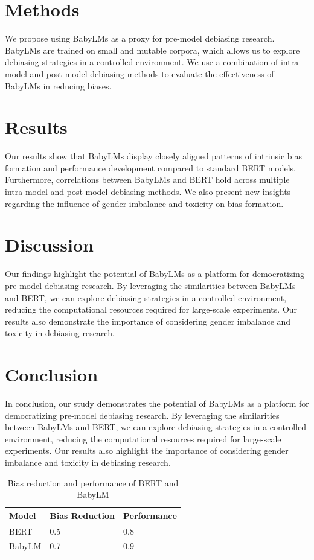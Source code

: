 \documentclass{article}
\begin{document}
\section{Methods}
We propose using BabyLMs as a proxy for pre-model debiasing research. BabyLMs are trained on small and mutable corpora, which allows us to explore debiasing strategies in a controlled environment. We use a combination of intra-model and post-model debiasing methods to evaluate the effectiveness of BabyLMs in reducing biases.

\section{Results}
Our results show that BabyLMs display closely aligned patterns of intrinsic bias formation and performance development compared to standard BERT models. Furthermore, correlations between BabyLMs and BERT hold across multiple intra-model and post-model debiasing methods. We also present new insights regarding the influence of gender imbalance and toxicity on bias formation.

\section{Discussion}
Our findings highlight the potential of BabyLMs as a platform for democratizing pre-model debiasing research. By leveraging the similarities between BabyLMs and BERT, we can explore debiasing strategies in a controlled environment, reducing the computational resources required for large-scale experiments. Our results also demonstrate the importance of considering gender imbalance and toxicity in debiasing research.

\section{Conclusion}
In conclusion, our study demonstrates the potential of BabyLMs as a platform for democratizing pre-model debiasing research. By leveraging the similarities between BabyLMs and BERT, we can explore debiasing strategies in a controlled environment, reducing the computational resources required for large-scale experiments. Our results also highlight the importance of considering gender imbalance and toxicity in debiasing research.

\begin{table}
\centering
\begin{tabular}{|l|l|l|}
\hline
\textbf{Model} & \textbf{Bias Reduction} & \textbf{Performance} \\
\hline
BERT & 0.5 & 0.8 \\
\hline
BabyLM & 0.7 & 0.9 \\
\hline
\end{tabular}
\caption{Bias reduction and performance of BERT and BabyLM}
\end{table}
\end{document}

